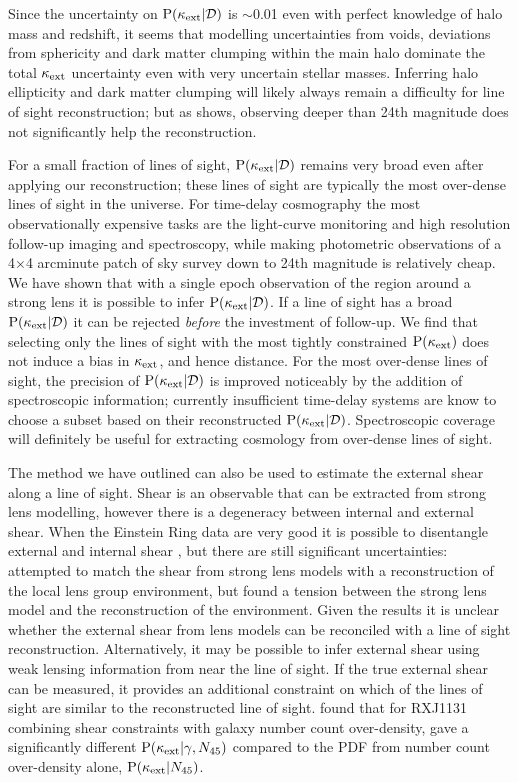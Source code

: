 \documentclass[useAMS,usenatbib]{mn2e}
\begin{document}
Since the uncertainty on ${\rm P}(\kappa_{\rm ext}|{\mathcal{D}})$ is $\sim$0.01 even
with perfect knowledge of halo mass and redshift, it seems that modelling uncertainties
from voids, deviations from sphericity and dark matter clumping within the
main halo dominate the total $\kappa_{\rm ext}$ uncertainty even with very
uncertain stellar masses. Inferring halo ellipticity and dark matter
clumping will likely always remain a difficulty for line of sight
reconstruction; but as  shows, observing deeper
than 24th magnitude does not significantly help the reconstruction.


For a small fraction of lines of sight, ${\rm P}(\kappa_{\rm ext}|{\mathcal{D}})$ remains very
broad even after applying our reconstruction; these lines of sight are
typically the most over-dense lines of sight in the universe. For
time-delay cosmography the most observationally expensive tasks are the
light-curve monitoring and high resolution follow-up imaging and spectroscopy,
while making photometric observations of a
4$\times$4 arcminute patch of sky survey down to 24th magnitude is
relatively cheap. We have shown that with a single epoch observation of
the region around a strong lens it is possible to infer ${\rm P}(\kappa_{\rm ext}|{\mathcal{D}})$.
If a line of sight has a broad ${\rm P}(\kappa_{\rm ext}|{\mathcal{D}})$ it can be rejected {\it
before} the investment of follow-up. We find that
selecting only the lines of sight with the most tightly constrained
${\rm P}(\kappa_{\rm ext})$ does not induce a bias in $\kappa_{\rm ext}$, and hence distance.
For the most over-dense lines of sight,
the precision of ${\rm P}(\kappa_{\rm ext}|{\mathcal{D}})$ is improved noticeably by the addition
of spectroscopic information; currently insufficient time-delay systems are
know to choose a subset based on their reconstructed ${\rm P}(\kappa_{\rm ext}|{\mathcal{D}})$.
Spectroscopic coverage will definitely be useful for extracting cosmology from
over-dense lines of sight.

The method we have outlined can also be used to estimate the external shear
along a line of sight. Shear is an observable that can be extracted from
strong lens modelling, however there is a degeneracy between internal and
external shear. When the Einstein Ring data are very good it is possible to
disentangle external and internal shear \citep[\eg][]{xxx}, but there are
still significant uncertainties: \citet{WongEtal2011} attempted to match the
shear from strong lens models with a reconstruction of the local lens group
environment, but found a tension between the strong lens model and the
reconstruction of the environment. Given the \citet{WongEtal2011} results
it is unclear whether the external shear from lens models can be
reconciled with a line of sight reconstruction. Alternatively, it may be possible 
to infer external shear using weak lensing information from near the line of sight. 
If the true external shear can be
measured, it provides an additional constraint on which of the \MS lines of
sight are similar to the reconstructed line of sight. \citet{SuyuEtal2012}
found that for RXJ1131 combining shear constraints with galaxy number count
over-density, gave a significantly different ${\rm P}(\kappa_{\rm ext}|\gamma,N_{45})$
compared to the PDF from number count over-density alone,
${\rm P}(\kappa_{\rm ext}|N_{45})$.
\end{document}
